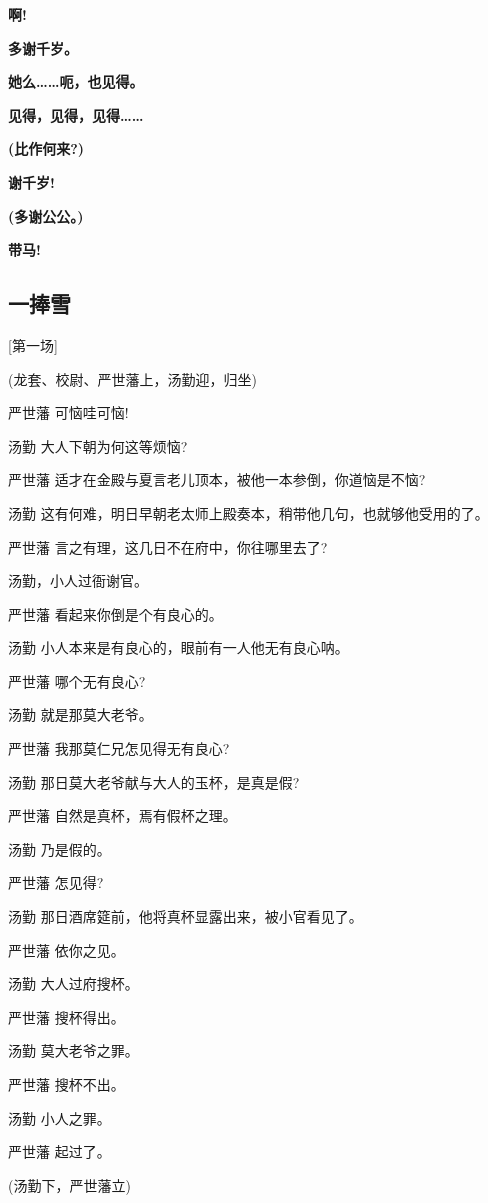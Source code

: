 \textbf{啊!}

\textbf{多谢千岁。}

\textbf{她么\ldots{}\ldots{}呃，也见得。}

\textbf{见得，见得，见得\ldots{}\ldots{}}

\textbf{(比作何来?)}

\textbf{谢千岁!}

\textbf{(多谢公公。)}

\textbf{带马!}

\hypertarget{ux4e00ux6367ux96ea}{%
\subsection{一捧雪}\label{ux4e00ux6367ux96ea}}

{[}第一场{]}

(龙套、校尉、严世藩上，汤勤迎，归坐)

严世藩 可恼哇可恼!

汤勤 大人下朝为何这等烦恼?

严世藩 适才在金殿与夏言老儿顶本，被他一本参倒，你道恼是不恼?

汤勤 这有何难，明日早朝老太师上殿奏本，稍带他几句，也就够他受用的了。

严世藩 言之有理，这几日不在府中，你往哪里去了?

汤勤，小人过衙谢官。

严世藩 看起来你倒是个有良心的。

汤勤 小人本来是有良心的，眼前有一人他无有良心呐。

严世藩 哪个无有良心?

汤勤 就是那莫大老爷。

严世藩 我那莫仁兄怎见得无有良心?

汤勤 那日莫大老爷献与大人的玉杯，是真是假?

严世藩 自然是真杯，焉有假杯之理。

汤勤 乃是假的。

严世藩 怎见得?

汤勤 那日酒席筵前，他将真杯显露出来，被小官看见了。

严世藩 依你之见。

汤勤 大人过府搜杯。

严世藩 搜杯得出。

汤勤 莫大老爷之罪。

严世藩 搜杯不出。

汤勤 小人之罪。

严世藩 起过了。

(汤勤下，严世藩立)

